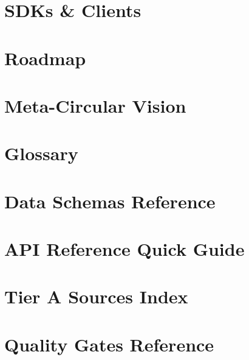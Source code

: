\documentclass[11pt,a4paper,twoside]{book}
\theoremstyle{definition}
\theoremstyle{remark}
\begin{document}
\chapter{SDKs \& Clients}
\label{ch:sdks_clients}


\chapter{Roadmap}
\label{ch:roadmap}


\chapter{Meta-Circular Vision}
\label{ch:meta_circular_vision}


\backmatter

\appendix

\chapter{Glossary}


\chapter{Data Schemas Reference}


\chapter{API Reference Quick Guide}


\chapter{Tier A Sources Index}


\chapter{Quality Gates Reference}





\printindex
\end{document}
